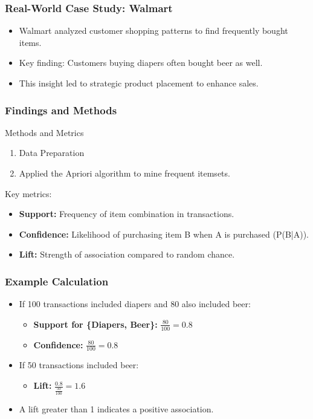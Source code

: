 \documentclass[aspectratio=169]{beamer}
\begin{document}
\begin{frame}[fragile]
    \frametitle{Real-World Case Study: Walmart}
    \begin{itemize}
        \item Walmart analyzed customer shopping patterns to find frequently bought items.
        \item Key finding: Customers buying diapers often bought beer as well.
        \item This insight led to strategic product placement to enhance sales.
    \end{itemize}
\end{frame}

\begin{frame}[fragile]
    \frametitle{Findings and Methods}
    \begin{block}{Methods and Metrics}
        \begin{enumerate}
            \item Data Preparation
            \item Applied the Apriori algorithm to mine frequent itemsets.
        \end{enumerate}
        Key metrics:
        \begin{itemize}
            \item \textbf{Support:} Frequency of item combination in transactions.
            \item \textbf{Confidence:} Likelihood of purchasing item B when A is purchased (P(B|A)).
            \item \textbf{Lift:} Strength of association compared to random chance.
        \end{itemize}
    \end{block}
\end{frame}

\begin{frame}[fragile]
    \frametitle{Example Calculation}
    \begin{itemize}
        \item If 100 transactions included diapers and 80 also included beer:
        \begin{itemize}
            \item \textbf{Support for \{Diapers, Beer\}:} \( \frac{80}{100} = 0.8 \)
            \item \textbf{Confidence:} \( \frac{80}{100} = 0.8 \)
        \end{itemize}
        \item If 50 transactions included beer:
        \begin{itemize}
            \item \textbf{Lift:} \( \frac{0.8}{\frac{50}{100}} = 1.6 \)
        \end{itemize}
        \item A lift greater than 1 indicates a positive association.
    \end{itemize}
\end{frame}
\end{document}
